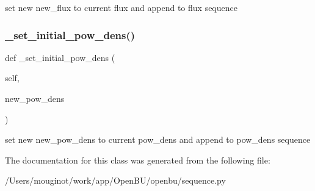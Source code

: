 \begin{DoxyVerb}set new new_flux to current flux and append to flux sequence\end{DoxyVerb}
 \mbox{\label{classopenbu_1_1sequence_1_1_sequence_a824e7bd80e4d7312e7327103b4862906}} 
\subsubsection{\texorpdfstring{\+\_\+set\+\_\+initial\+\_\+pow\+\_\+dens()}{\_set\_initial\_pow\_dens()}}
{\footnotesize\ttfamily def \+\_\+set\+\_\+initial\+\_\+pow\+\_\+dens (\begin{DoxyParamCaption}\item[{}]{self,  }\item[{}]{new\+\_\+pow\+\_\+dens }\end{DoxyParamCaption})\hspace{0.3cm}{\ttfamily [private]}}

\begin{DoxyVerb}set new new_pow_dens to current pow_dens and append to pow_dens sequence\end{DoxyVerb}
 

The documentation for this class was generated from the following file\+:\begin{DoxyCompactItemize}
\item 
/\+Users/mouginot/work/app/\+Open\+B\+U/openbu/sequence.\+py\end{DoxyCompactItemize}
